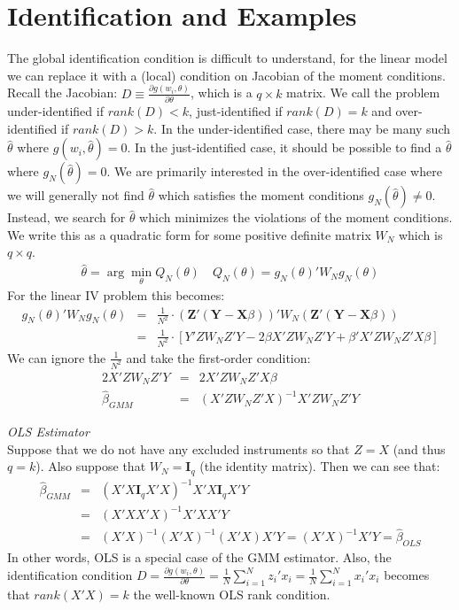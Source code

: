 \documentclass[a4paper]{article}
\begin{document}
\section*{\normalsize  Identification and Examples}
The global identification condition is difficult to understand, for the linear model we can replace it with a (local) condition on Jacobian of the moment conditions. Recall the Jacobian: $D \equiv \frac{\partial g(w_i,\theta)}{\partial \theta}$, which is a $q \times k$ matrix. We call the problem under-identified if $rank(D) < k$, just-identified if $rank(D) = k$ and over-identified if $rank(D) > k$. In the under-identified case, there may be many such $\hat{\theta}$ where $g(w_i,\hat{\theta}) =0$. In the just-identified case, it should be possible to find a $\hat{\theta}$ where $g_N(\hat{\theta})=0$. We are primarily interested in the over-identified case where we will generally not find $\hat{\theta}$ which satisfies the moment conditions $g_N(\hat{\theta})\neq0$. Instead, we search for $\hat{\theta}$ which minimizes the violations of the moment conditions. We write this as a quadratic form for some positive definite matrix $W_N$ which is $q \times q$.
\begin{eqnarray*}
\hat{\theta} = \arg \min_{\theta}  Q_N(\theta) \quad Q_N(\theta)=g_N(\theta)' W_N  g_N(\theta)
\end{eqnarray*}
For the linear IV problem this becomes:
\begin{eqnarray*}
g_N(\theta)' W_N  g_N(\theta) &=& \frac{1}{N^2} \cdot (\symbf{Z}' (\symbf{Y} - \symbf{X} \beta))' W_N (\symbf{Z}' (\symbf{Y} - \symbf{X} \beta)) \\
&=& \frac{1}{N^2}\cdot [Y'Z W_N Z' Y - 2 \beta X' Z W_N Z' Y + \beta' X' Z W_N Z' X \beta]
\end{eqnarray*}
We can ignore the $\frac{1}{N^2}$ and take the first-order condition:
\begin{eqnarray*}
2 X'Z W_N Z' Y &=& 2 X'Z W_N Z' X \beta\\
\hat{\beta}_{GMM} &=& (X'Z W_N Z' X)^{-1} X' Z W_N Z'Y
\end{eqnarray*}

\noindent \textit{OLS Estimator}\\
Suppose that we do not have any excluded instruments so that $Z=X$ (and thus $q=k$). Also suppose that $W_N = \symbf{I}_q$ (the identity matrix). Then we can see that:
\begin{eqnarray*}
\hat{\beta}_{GMM} &=& (X'X \symbf{I}_q X' X)^{-1} X' X \symbf{I}_q X'Y\\
 &=& (X'X X' X)^{-1} X' X X'Y\\
 &=& (X'X)^{-1} (X' X)^{-1} (X' X) X'Y =  (X'X)^{-1} X'Y = \hat{\beta}_{OLS}
\end{eqnarray*}
In other words, OLS is a special case of the GMM estimator. Also, the identification condition $D=\frac{\partial g(w_i,\theta)}{\partial \theta} =\frac{1}{N} \sum_{i=1}^N z_i' x_i = \frac{1}{N} \sum_{i=1}^N x_i' x_i$ becomes that $rank(X'X) = k$ the well-known OLS rank condition.\\
\end{document}
